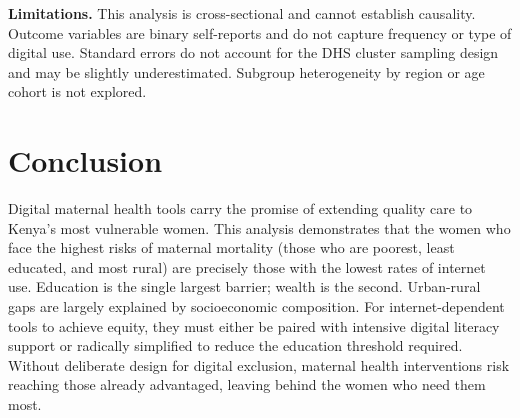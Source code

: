 \documentclass[9pt,twoside]{pnas-new}
\begin{document}
\textbf{Limitations.} This analysis is cross-sectional and cannot
establish causality. Outcome variables are binary self-reports and do not
capture frequency or type of digital use. Standard errors do not account
for the DHS cluster sampling design and may be slightly underestimated.
Subgroup heterogeneity by region or age cohort is not explored.

\section*{Conclusion}

Digital maternal health tools carry the promise of extending quality care
to Kenya's most vulnerable women. This analysis demonstrates that the
women who face the highest risks of maternal mortality (those who are
poorest, least educated, and most rural) are precisely those with the
lowest rates of internet use. Education is the single largest barrier;
wealth is the second. Urban-rural gaps are largely explained by
socioeconomic composition. For internet-dependent tools to achieve
equity, they must either be paired with intensive digital literacy
support or radically simplified to reduce the education threshold
required. Without deliberate design for digital exclusion, maternal
health interventions risk reaching those already advantaged, leaving
behind the women who need them most.



\showacknow{}


\end{document}
